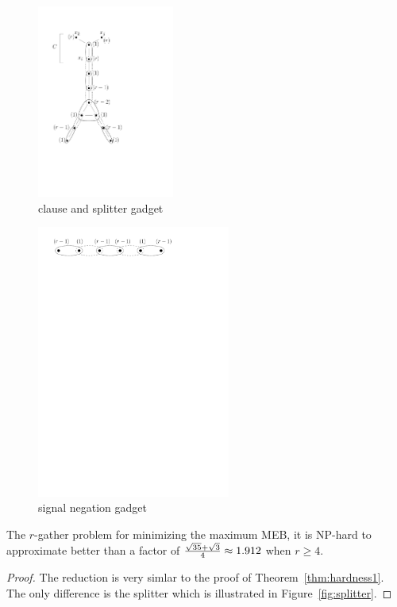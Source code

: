 \begin{figure}[htbp]
\begin{center}
\includegraphics[height=2.5in]{figs/hardness}
\caption{clause and splitter gadget}
\label{fig:3satconstruction}
\end{center}
\end{figure}

\begin{figure}[htbp]
\begin{center}
\includegraphics[width=2.5in]{figs/negation}
\caption{signal negation gadget}
\label{fig:negation}
\end{center}
\end{figure}

\begin{theorem}
The $r$-gather problem for minimizing the maximum MEB, it is NP-hard to approximate better than a factor of ${\sqrt{35}+\sqrt{3} \over 4} \approx 1.912$ when $r\geq4$.
\end{theorem}
\begin{proof}
The reduction is very simlar to the proof of Theorem~\ref{thm:hardness1}.  The only difference is the splitter which is illustrated in Figure~\ref{fig:splitter}.
\end{proof}


